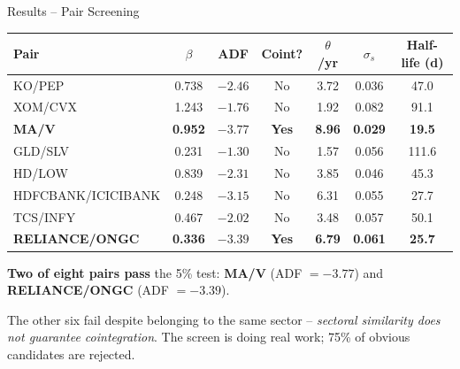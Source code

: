 \documentclass[10pt,aspectratio=169]{beamer}
\begin{document}
\begin{frame}{Results -- Pair Screening}

\centering
\small
\begin{tabular}{lcccccc}
\toprule
Pair & $\beta$ & ADF & Coint? & $\theta$/yr & $\sigma_s$ & Half-life (d) \\
\midrule
KO/PEP                   & 0.738 & $-2.46$ & No  & 3.72 & 0.036 &  47.0 \\
XOM/CVX                  & 1.243 & $-1.76$ & No  & 1.92 & 0.082 &  91.1 \\
\textbf{MA/V}            & \textbf{0.952} & $\boldsymbol{-3.77}$ & \textbf{Yes} & \textbf{8.96} & \textbf{0.029} & \textbf{19.5} \\
GLD/SLV                  & 0.231 & $-1.30$ & No  & 1.57 & 0.056 & 111.6 \\
HD/LOW                   & 0.839 & $-2.31$ & No  & 3.85 & 0.046 &  45.3 \\
HDFCBANK/ICICIBANK       & 0.248 & $-3.15$ & No  & 6.31 & 0.055 &  27.7 \\
TCS/INFY                 & 0.467 & $-2.02$ & No  & 3.48 & 0.057 &  50.1 \\
\textbf{RELIANCE/ONGC}   & \textbf{0.336} & $\boldsymbol{-3.39}$ & \textbf{Yes} & \textbf{6.79} & \textbf{0.061} & \textbf{25.7} \\
\bottomrule
\end{tabular}

\bigskip
\flushleft
\textbf{Two of eight pairs pass} the 5\% test:
\textbf{MA/V} (ADF $=-3.77$) and \textbf{RELIANCE/ONGC} (ADF $=-3.39$).

\medskip
The other six fail despite belonging to the same sector --
\emph{sectoral similarity does not guarantee cointegration}. The screen
is doing real work; 75\% of obvious candidates are rejected.

\end{frame}
\end{document}
